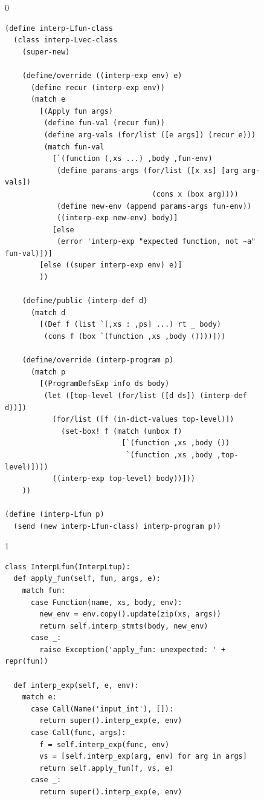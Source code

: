 \documentclass[7x10]{TimesAPriori_MIT}%
\def\racketEd{0}
\def\pythonEd{1}
\providecommand{\BookEdition}{1}
\let\edition\BookEdition
\newcommand{\pythonColor}[0]{}
\numberwithin{theorem}{chapter}
\numberwithin{definition}{chapter}
\numberwithin{equation}{chapter}
\begin{document}
\begin{figure}[tp]
  \begin{tcolorbox}[colback=white]
    {\if\edition\racketEd  
\begin{lstlisting}
(define interp-Lfun-class
  (class interp-Lvec-class
    (super-new)

    (define/override ((interp-exp env) e)
      (define recur (interp-exp env))
      (match e
        [(Apply fun args)
         (define fun-val (recur fun))
         (define arg-vals (for/list ([e args]) (recur e)))
         (match fun-val
           [`(function (,xs ...) ,body ,fun-env)
            (define params-args (for/list ([x xs] [arg arg-vals])
                                  (cons x (box arg))))
            (define new-env (append params-args fun-env))
            ((interp-exp new-env) body)]
           [else
            (error 'interp-exp "expected function, not ~a" fun-val)])]
        [else ((super interp-exp env) e)]
        ))

    (define/public (interp-def d)
      (match d
        [(Def f (list `[,xs : ,ps] ...) rt _ body)
         (cons f (box `(function ,xs ,body ())))]))

    (define/override (interp-program p)
      (match p
        [(ProgramDefsExp info ds body)
         (let ([top-level (for/list ([d ds]) (interp-def d))])
           (for/list ([f (in-dict-values top-level)])
             (set-box! f (match (unbox f)
                           [`(function ,xs ,body ())
                            `(function ,xs ,body ,top-level)])))
           ((interp-exp top-level) body))]))
    ))

(define (interp-Lfun p)
  (send (new interp-Lfun-class) interp-program p))
\end{lstlisting}
\fi}
{\if\edition\pythonEd\pythonColor
\begin{lstlisting}
class InterpLfun(InterpLtup):
  def apply_fun(self, fun, args, e):
    match fun:
      case Function(name, xs, body, env):
        new_env = env.copy().update(zip(xs, args))
        return self.interp_stmts(body, new_env)
      case _:
        raise Exception('apply_fun: unexpected: ' + repr(fun))
    
  def interp_exp(self, e, env):
    match e:
      case Call(Name('input_int'), []):
        return super().interp_exp(e, env)      
      case Call(func, args):
        f = self.interp_exp(func, env)
        vs = [self.interp_exp(arg, env) for arg in args]
        return self.apply_fun(f, vs, e)
      case _:
        return super().interp_exp(e, env)


\end{lstlisting}}
\end{tcolorbox}
\end{figure}
\end{document}
